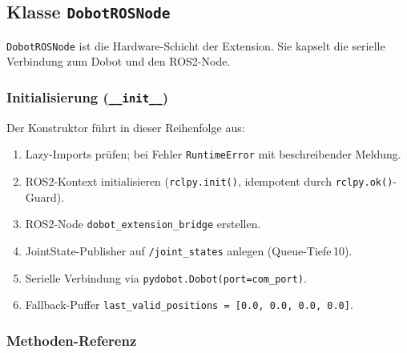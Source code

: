 \documentclass[11pt,a4paper]{article}
\begin{document}
\subsection{Klasse \texttt{DobotROSNode}}
\label{sec:rosnode}

\texttt{DobotROSNode} ist die Hardware-Schicht der Extension.
Sie kapselt die serielle Verbindung zum Dobot und den ROS2-Node.

\subsubsection{Initialisierung (\texttt{\_\_init\_\_})}

Der Konstruktor führt in dieser Reihenfolge aus:
\begin{enumerate}
  \item Lazy-Imports prüfen; bei Fehler \texttt{RuntimeError} mit
        beschreibender Meldung.
  \item ROS2-Kontext initialisieren (\texttt{rclpy.init()},
        idempotent durch \texttt{rclpy.ok()}-Guard).
  \item ROS2-Node \texttt{dobot\_extension\_bridge} erstellen.
  \item JointState-Publisher auf \texttt{/joint\_states} anlegen
        (Queue-Tiefe\,10).
  \item Serielle Verbindung via \texttt{pydobot.Dobot(port=com\_port)}.
  \item Fallback-Puffer
        \texttt{last\_valid\_positions = [0.0, 0.0, 0.0, 0.0]}.
\end{enumerate}

\subsubsection{Methoden-Referenz}
\end{document}
